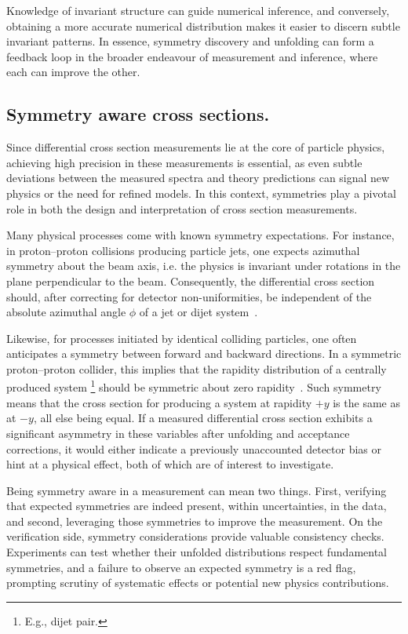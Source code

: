         Knowledge of invariant structure can guide numerical inference, and conversely, obtaining a more accurate numerical distribution makes it easier to discern subtle invariant patterns.
        In essence, symmetry discovery and unfolding can form a feedback loop in the broader endeavour of measurement and inference, where each can improve the other.

    \subsection{Symmetry aware cross sections.}
        Since differential cross section measurements lie at the core of particle physics,
        achieving high precision in these measurements is essential, as even subtle deviations between the measured spectra and theory predictions can signal new physics or the need for refined models.
        In this context, symmetries play a pivotal role in both the design and interpretation of cross section measurements.

        Many physical processes come with known symmetry expectations.
        For instance, in proton--proton collisions producing particle jets, one expects azimuthal symmetry about the beam axis, i.e. the physics is invariant under rotations in the plane perpendicular to the beam.
        Consequently, the differential cross section should, after correcting for detector non-uniformities, be independent of the absolute azimuthal angle $\phi$ of a jet or dijet system~\cite{Chen:2025rjc, Spinner:2025prg, Pedersen:2023fgr, Froidevaux2009ExperimentalCollider}.
        
        Likewise, for processes initiated by identical colliding particles, one often anticipates a symmetry between forward and backward directions.
        In a symmetric proton--proton collider, this implies that the rapidity distribution of a centrally produced system \footnote{E.g., dijet pair.} should be symmetric about zero rapidity~\cite{Cheung:2017loo, CMS:2011xqa, Cotogno:2020iio}.
        Such symmetry means that the cross section for producing a system at rapidity $+y$ is the same as at $-y$, all else being equal.
        If a measured differential cross section exhibits a significant asymmetry in these variables after unfolding and acceptance corrections, it would either indicate a previously unaccounted detector bias or hint at a physical effect, both of which are of interest to investigate.

        Being symmetry aware in a measurement can mean two things.
        First, verifying that expected symmetries are indeed present, within uncertainties, in the data, and second, leveraging those symmetries to improve the measurement.
        On the verification side, symmetry considerations provide valuable consistency checks.
        Experiments can test whether their unfolded distributions respect fundamental symmetries, and a failure to observe an expected symmetry is a red flag, prompting scrutiny of systematic effects or potential new physics contributions.

